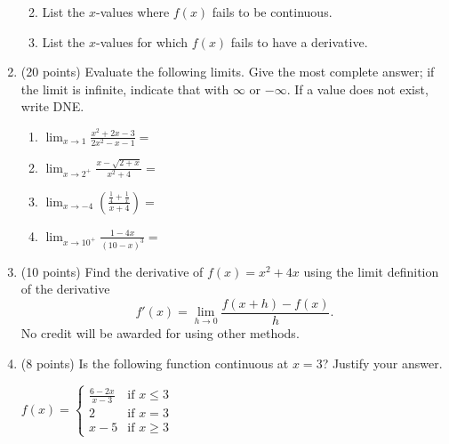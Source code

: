 \documentclass[12pt]{article}
\begin{document}
\begin{enumerate}
\begin{enumerate}
\vspace{1cm}
\item List the $x$-values where $f(x)$ fails to be continuous.\\
\vfill
\item List the $x$-values for which $f(x)$ fails to have a derivative.\\\vfill
\vspace{\mysep}
\end{enumerate}
\newpage
\item (20 points)  Evaluate the following limits. Give the most complete answer; if the limit is infinite, indicate that with $\infty$ or $-\infty.$ If a value does not exist, write DNE.\\
	\begin{enumerate}
	\item $\displaystyle{\lim_{x \to 1 } \frac{x^2+2x-3}{2x^2-x-1} =}$
	\vfill
	\item $\displaystyle{\lim_{x \to 2^+ }  \frac{x-\sqrt{2+x}}{x^2+4}=}$
	\vfill
	\item $\displaystyle{\lim_{x \to -4} \left(\frac{\frac{1}{4} + \frac{1}{x}}{x+4} \right)=}$
	\vfill
	\item $\displaystyle{\lim_{x  \to 10^+} \frac{1-4x}{(10-x)^3}=}$
	\vfill
	
	
	\end{enumerate}
\newpage

\item (10 points) Find the derivative of $f(x) = x^2 + 4x$  using the limit definition of the derivative $$f'(x)=\displaystyle{\lim_{h \rightarrow 0}\frac{f(x+h)-f(x)}{h}}.$$ No credit will be awarded for using other methods.
\newpage
\item (8 points) Is the following function continuous at $x=3$? Justify your answer. 

$
f(x) = \begin{cases}
\frac{6-2x}{x-3} & \text{if } x \leq 3\\
2  & \text{if } x =3\\
x-5  & \text{if } x \geq 3
\end{cases}
$

\vfill


\end{enumerate}
\end{document}
